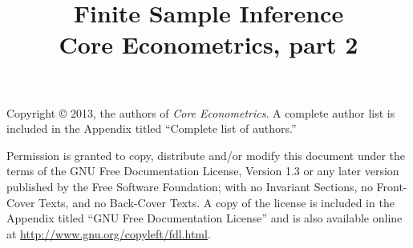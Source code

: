 \documentclass[nohyper]{tufte-handout}
\title[Finite Sample Inference]%
{Finite Sample Inference \\
  Core Econometrics, part 2}
\begin{document}
\maketitle

\bigskip\noindent%
Copyright © 2013, the authors of \textit{Core Econometrics}.  A
complete author list is included in the Appendix titled ``Complete
list of authors.''

Permission is granted to copy, distribute and/or modify this document
under the terms of the GNU Free Documentation License, Version 1.3 or
any later version published by the Free Software Foundation; with no
Invariant Sections, no Front-Cover Texts, and no Back-Cover Texts.  A
copy of the license is included in the Appendix titled ``GNU Free
Documentation License'' and is also available online at
\url{http://www.gnu.org/copyleft/fdl.html}.

\tableofcontents















\end{document}

